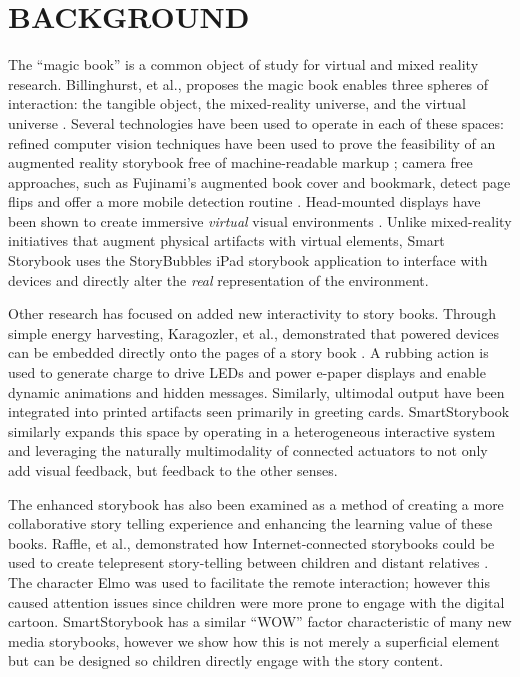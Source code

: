 \documentclass{sigchi}
\newcommand\namesp{SmartStorybook }
\begin{document}
\section{BACKGROUND}
The ``magic book'' is a common object of study for virtual and mixed reality research.
Billinghurst, et al., proposes the magic book enables three spheres of interaction: the tangible object, the mixed-reality universe, and the virtual universe \cite{billinghurst_magicbook-moving_2001}. Several technologies have been used to operate in each of these spaces: refined computer vision techniques have been used to prove the feasibility of an augmented reality storybook free of machine-readable markup \cite{scherrer_haunted_2008}; camera free approaches, such as Fujinami's augmented book cover and bookmark, detect page flips and offer a more mobile detection routine \cite{fujinami_page-flipping_2009}. Head-mounted displays have been shown to create immersive \textit{virtual} visual environments \cite{saso_little_2003}. Unlike mixed-reality initiatives that augment physical artifacts with virtual elements, Smart Storybook uses the StoryBubbles iPad storybook application to interface with devices and directly alter the \textit{real} representation of the environment.

Other research has focused on added new interactivity to story books. 
Through simple energy harvesting, Karagozler, et al., demonstrated that powered devices can be embedded directly onto the pages of a story book \cite{karagozler_paper_2013}. A rubbing action is used to generate charge to drive LEDs and power e-paper displays and enable dynamic animations and hidden messages. 
Similarly, ultimodal output have been integrated into printed artifacts \cite{iggulden_printed_1999} seen primarily in greeting cards. \namesp similarly expands this space by operating in a heterogeneous interactive system and leveraging the naturally multimodality of connected actuators to not only add visual feedback, but feedback to the other senses.  

The enhanced storybook has also been examined as a method of creating a more collaborative story telling experience and enhancing the learning value of these books. Raffle, et al., demonstrated how Internet-connected storybooks could be used to create telepresent story-telling between children and distant relatives \cite{raffle_family_2010}. The character Elmo was used to facilitate the remote interaction; however this caused attention issues since children were more prone to engage with the digital cartoon. SmartStorybook has a similar ``WOW'' factor characteristic of many new media storybooks, however we show how this is not merely a superficial element but can be designed so children directly engage with the story content. 
\end{document}
